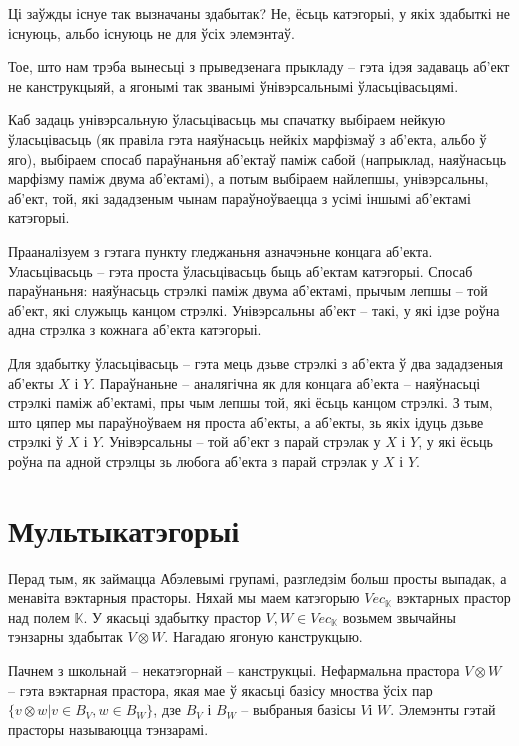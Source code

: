 \documentclass[a4paper,12pt]{book}
\begin{document}
Ці заўжды існуе так вызначаны здабытак? Не, ёсьць катэгорыі, у якіх
здабыткі не існуюць, альбо існуюць не для ўсіх элемэнтаў.

Тое, што нам трэба вынесьці з прыведзенага прыкладу -- гэта ідэя
задаваць аб'ект не канструкцыяй, а ягонымі так званымі ўнівэрсальнымі
ўласьцівасьцямі.

Каб задаць унівэрсальную ўласьцівасьць мы спачатку выбіраем нейкую
ўласьцівасьць (як правіла гэта наяўнасьць нейкіх марфізмаў з аб'екта,
альбо ў яго), выбіраем спосаб параўнаньня аб'ектаў паміж сабой
(напрыклад, наяўнасьць марфізму паміж двума аб'ектамі), а потым
выбіраем найлепшы, унівэрсальны, аб'ект, той, які зададзеным чынам
параўноўваецца з усімі іншымі аб'ектамі катэгорыі.

Прааналізуем з гэтага пункту гледжаньня азначэньне концага
аб'екта. Уласьцівасьць -- гэта проста ўласьцівасьць быць аб'ектам
катэгорыі. Спосаб параўнаньня: наяўнасьць стрэлкі паміж двума
аб'ектамі, прычым лепшы -- той аб'ект, які служыць канцом
стрэлкі. Унівэрсальны аб'ект -- такі, у які ідзе роўна адна стрэлка з
кожнага аб'екта катэгорыі.

Для здабытку ўласьцівасьць -- гэта мець дзьве стрэлкі з аб'екта ў два
зададзеныя аб'екты $X$ і $Y$. Параўнаньне -- аналягічна як для концага
аб'екта
-- наяўнасьці стрэлкі паміж аб'ектамі, пры чым лепшы той, які ёсьць
канцом стрэлкі. З тым, што цяпер мы параўноўваем ня проста аб'екты, а
аб'екты, зь якіх ідуць дзьве стрэлкі ў $X$ і $Y$.
Унівэрсальны -- той аб'ект з парай стрэлак у $X$ і $Y$, у які ёсьць роўна
па адной стрэлцы зь любога аб'екта з парай стрэлак у $X$ і $Y$.

\section{Мультыкатэгорыі}

Перад тым, як займацца Абэлевымі групамі, разгледзім больш просты
выпадак, а менавіта вэктарныя прасторы. Няхай мы маем катэгорыю
$Vec_{\mathbb{K}}$ вэктарных прастор
над полем $\mathbb{K}$. У якасьці здабытку прастор $V, W \in
Vec_{\mathbb{K}}$ возьмем звычайны тэнзарны здабытак $V \otimes
W$. Нагадаю ягоную канструкцыю.

Пачнем з школьнай -- некатэгорнай -- канструкцыі. Нефармальна прастора
$V \otimes W$ -- гэта вэктарная прастора, якая мае ў якасьці базісу
мноства ўсіх пар $\{v \otimes w|v \in B_V, w \in B_W\}$, дзе $B_V$ і
$B_W$ -- выбраныя базісы $V$і $W$. Элемэнты гэтай
прасторы называюцца тэнзарамі.
\end{document}
